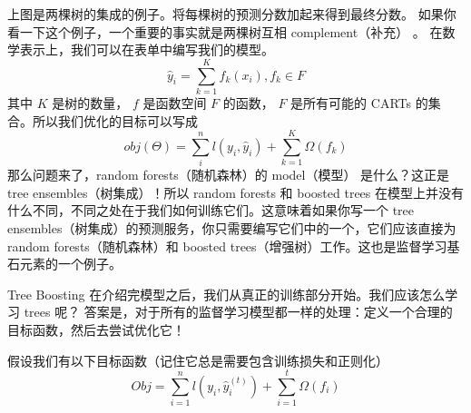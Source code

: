 \documentclass{article}
\begin{document}
上图是两棵树的集成的例子。将每棵树的预测分数加起来得到最终分数。 如果你看一下这个例子，一个重要的事实就是两棵树互相 complement（补充） 。 在数学表示上，我们可以在表单中编写我们的模型。
\[\hat{y}_i=\sum_{k=1}^Kf_k(x_i),f_k\in F\]
其中 $K$ 是树的数量， $f$ 是函数空间 $F$ 的函数， $F$ 是所有可能的 CARTs 的集合。所以我们优化的目标可以写成
\[obj(\Theta)=\sum_i^n l(y_i,\hat{y}_i)+\sum_{k=1}^K\Omega(f_k)\]
那么问题来了，random forests（随机森林）的 model（模型） 是什么？这正是 tree ensembles（树集成）！所以 random forests 和 boosted trees 在模型上并没有什么不同，不同之处在于我们如何训练它们。这意味着如果你写一个 tree ensembles（树集成）的预测服务，你只需要编写它们中的一个，它们应该直接为 random forests（随机森林）和 boosted trees（增强树）工作。这也是监督学习基石元素的一个例子。

Tree Boosting
在介绍完模型之后，我们从真正的训练部分开始。我们应该怎么学习 trees 呢？ 答案是，对于所有的监督学习模型都一样的处理：定义一个合理的目标函数，然后去尝试优化它！

假设我们有以下目标函数（记住它总是需要包含训练损失和正则化）
\[Obj=\sum_{i=1}^n l(y_i,\hat{y}_i^{(t)})+\sum_{i=1}^t\Omega(f_i)\]
\end{document}
